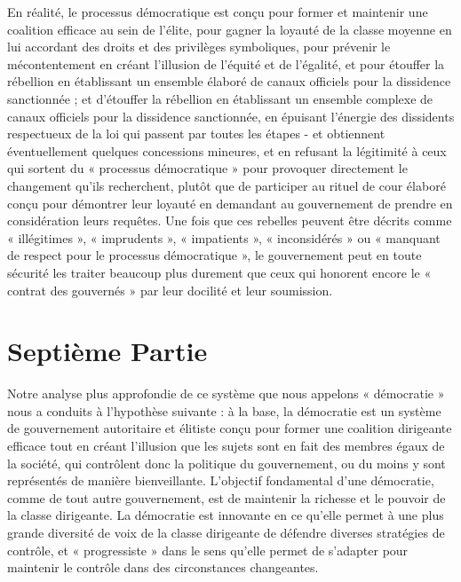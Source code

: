 En réalité, le processus démocratique est conçu pour former et maintenir une coalition efficace au sein de l'élite, pour gagner la loyauté de la classe moyenne en lui accordant des droits et des privilèges symboliques, pour prévenir le mécontentement en créant l'illusion de l'équité et de l'égalité, et pour étouffer la rébellion en établissant un ensemble élaboré de canaux officiels pour la dissidence sanctionnée ; et d'étouffer la rébellion en établissant un ensemble complexe de canaux officiels pour la dissidence sanctionnée, en épuisant l'énergie des dissidents respectueux de la loi qui passent par toutes les étapes - et obtiennent éventuellement quelques concessions mineures, et en refusant la légitimité à ceux qui sortent du « processus démocratique » pour provoquer directement le changement qu'ils recherchent, plutôt que de participer au rituel de cour élaboré conçu pour démontrer leur loyauté en demandant au gouvernement de prendre en considération leurs requêtes. Une fois que ces rebelles peuvent être décrits comme « illégitimes », « imprudents », « impatients », « inconsidérés » ou « manquant de respect pour le processus démocratique », le gouvernement peut en toute sécurité les traiter beaucoup plus durement que ceux qui honorent encore le « contrat des gouvernés » par leur docilité et leur soumission.

\chapter*{\textbf{Septième Partie}}\hypertarget{septime-partie}{}\label{septime-partie}

Notre analyse plus approfondie de ce système que nous appelons « démocratie » nous a conduits à l'hypothèse suivante : à la base, la démocratie est un système de gouvernement autoritaire et élitiste conçu pour former une coalition dirigeante efficace tout en créant l'illusion que les sujets sont en fait des membres égaux de la société, qui contrôlent donc la politique du gouvernement, ou du moins y sont représentés de manière bienveillante. L'objectif fondamental d'une démocratie, comme de tout autre gouvernement, est de maintenir la richesse et le pouvoir de la classe dirigeante. La démocratie est innovante en ce qu'elle permet à une plus grande diversité de voix de la classe dirigeante de défendre diverses stratégies de contrôle, et « progressiste » dans le sens qu'elle permet de s'adapter pour maintenir le contrôle dans des circonstances changeantes.

